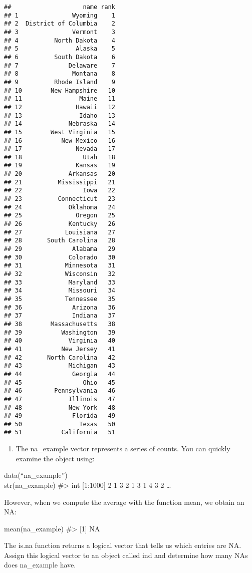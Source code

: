 \documentclass[
]{article}
\providecommand{\tightlist}{%
  \setlength{\itemsep}{0pt}\setlength{\parskip}{0pt}}
\begin{document}
\begin{verbatim}
##                    name rank
## 1               Wyoming    1
## 2  District of Columbia    2
## 3               Vermont    3
## 4          North Dakota    4
## 5                Alaska    5
## 6          South Dakota    6
## 7              Delaware    7
## 8               Montana    8
## 9          Rhode Island    9
## 10        New Hampshire   10
## 11                Maine   11
## 12               Hawaii   12
## 13                Idaho   13
## 14             Nebraska   14
## 15        West Virginia   15
## 16           New Mexico   16
## 17               Nevada   17
## 18                 Utah   18
## 19               Kansas   19
## 20             Arkansas   20
## 21          Mississippi   21
## 22                 Iowa   22
## 23          Connecticut   23
## 24             Oklahoma   24
## 25               Oregon   25
## 26             Kentucky   26
## 27            Louisiana   27
## 28       South Carolina   28
## 29              Alabama   29
## 30             Colorado   30
## 31            Minnesota   31
## 32            Wisconsin   32
## 33             Maryland   33
## 34             Missouri   34
## 35            Tennessee   35
## 36              Arizona   36
## 37              Indiana   37
## 38        Massachusetts   38
## 39           Washington   39
## 40             Virginia   40
## 41           New Jersey   41
## 42       North Carolina   42
## 43             Michigan   43
## 44              Georgia   44
## 45                 Ohio   45
## 46         Pennsylvania   46
## 47             Illinois   47
## 48             New York   48
## 49              Florida   49
## 50                Texas   50
## 51           California   51
\end{verbatim}

\begin{enumerate}
\def\labelenumi{\arabic{enumi}.}
\setcounter{enumi}{6}
\tightlist
\item
  The na\_example vector represents a series of counts. You can quickly
  examine the object using:
\end{enumerate}

data(``na\_example'')\\
str(na\_example) \#\textgreater{} int {[}1:1000{]} 2 1 3 2 1 3 1 4 3 2
\ldots{}

However, when we compute the average with the function mean, we obtain
an NA:

mean(na\_example) \#\textgreater{} {[}1{]} NA

The is.na function returns a logical vector that tells us which entries
are NA. Assign this logical vector to an object called ind and determine
how many NAs does na\_example have.
\end{document}
